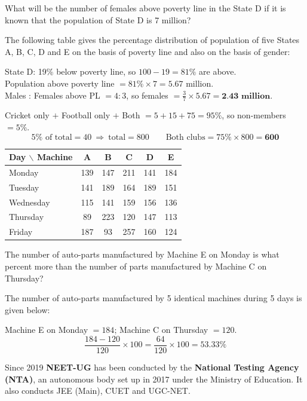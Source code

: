 What will be the number of females above poverty line in the State D if it is known that the population of State D is 7 million?

The following table gives the percentage distribution of population of five States A, B, C, D and E on the basis of poverty line and also on the basis of gender:

State D: 19\% below poverty line, so $100-19=81\%$ are above.\\
Population above poverty line $=81\%\times7=5.67$ million.\\
Males : Females above PL $=4:3$, so females $=\tfrac37\times5.67=\textbf{2.43 million}$.

Cricket only $+$ Football only $+$ Both $=5+15+75=95\%$, so non-members $=5\%$.
\[5\%\text{ of total}=40\ \Rightarrow\ \text{total}=800\qquad \text{Both clubs}=75\%\times800=\mathbf{600}\]

\small
\begin{tabular}{lccccc}\toprule
\textbf{Day} $\backslash$ \textbf{Machine} & \textbf{A} & \textbf{B} & \textbf{C} & \textbf{D} & \textbf{E}\\\midrule
Monday & 139 & 147 & 211 & 141 & 184\\ Tuesday & 141 & 189 & 164 & 189 & 151\\ Wednesday & 115 & 141 & 159 & 156 & 136\\ Thursday & 89 & 223 & 120 & 147 & 113\\ Friday & 187 & 93 & 257 & 160 & 124\\\bottomrule
\end{tabular}

The number of auto-parts manufactured by Machine E on Monday is what percent more than the number of parts manufactured by Machine C on Thursday?

The number of auto-parts manufactured by 5 identical machines during 5 days is given below:

Machine E on Monday $=184$; Machine C on Thursday $=120$.
\[\frac{184-120}{120}\times100=\frac{64}{120}\times100=\mathbf{53.33\%}\]

Since 2019 \textbf{NEET-UG} has been conducted by the \textbf{National Testing Agency (NTA)}, an autonomous body set up in 2017 under the Ministry of Education. It also conducts JEE (Main), CUET and UGC-NET.

